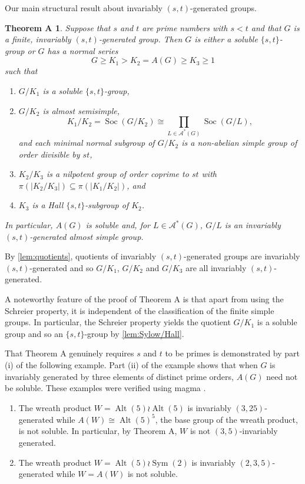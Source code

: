 \documentclass[12pt,a4paper]{amsart}
\newtheorem*{thmA}{Theorem A}
\DeclareMathOperator{\Alt}{Alt}
\DeclareMathOperator{\Sym}{Sym}
\DeclareMathOperator{\Soc}{Soc}
\begin{document}
Our main structural result about invariably $(s,t)$-generated groups.




\begin{thmA}\label{thm:thm1} Suppose that $s$ and $t$ are prime numbers with $s< t$ and that $G$ is a finite, invariably $(s,t)$-generated group. Then   $G$ is either a soluble $\{s,t\}$-group or $G$  has a normal series $$G\ge K_1> K_2= A(G)\ge K_3\ge 1$$ such that \begin{enumerate} \item $G/K_1$ is a soluble  $\{s,t\}$-group,
\item $G/K_2$ is almost semisimple, $$K_1/K_2 =\Soc(G/K_2)\cong\prod_{L\in \mathcal A^*(G)}\Soc(G/L),$$ and each minimal normal subgroup of $G/K_2$ is a non-abelian simple group of order divisible by $st$,
\item $K_2/K_3$ is a nilpotent group of order coprime to $st$ with $\pi(|K_2/K_3|) \subseteq  \pi(|K_1/K_2|)$, and \item $K_3$ is  a Hall $\{s,t\}$-subgroup of $K_2$.
\end{enumerate}
In particular, $A(G)$ is soluble and, for $L \in\mathcal A^*(G)$, $G/L$ is an invariably $(s,t)$-generated almost simple group.
\end{thmA}

  By \cref{lem:quotients}, quotients of invariably $(s,t)$-generated groups are invariably $(s,t)$-generated and so $G/K_1$, $G/K_2$ and $G/K_3$ are all invariably $(s,t)$-generated.



A noteworthy feature of the proof of Theorem A is that apart from  using the Schreier property, it is  independent of the classification of the finite simple groups. In particular, the Schreier property  yields the quotient $G/K_1$ is a soluble group and so an $\{s,t\}$-group by \cref{lem:Sylow/Hall}.


That Theorem A genuinely  requires $s$ and $t$ to be primes  is demonstrated by part (i) of the following example. Part  (ii) of the example  shows that when $G$ is invariably generated by three elements of distinct prime orders, $A(G)$ need not be soluble. These examples were verified using {\sc magma} \cite{Magma}.

\begin{example}
\begin{enumerate}
\item The wreath product $W=\Alt(5) \wr \Alt(5)$ is invariably $(3,25)$-generated while $A(W)\cong \Alt(5)^5$, the base group of the wreath product,   is not soluble. In particular, by Theorem A, $W$ is not $(3,5)$-invariably generated.
    \item The wreath product $W=\Alt(5) \wr \Sym(2)$ is invariably $(2,3,5)$-generated while $W=A(W)$ is not soluble.
    \end{enumerate} \end{example}
\end{document}
